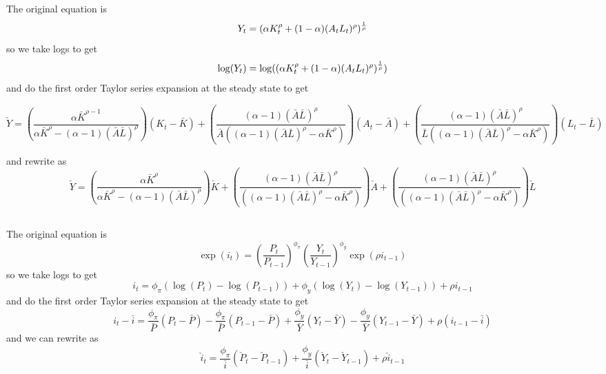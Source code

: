 \documentclass[11pt]{amsart}
\begin{document}
\subsection{}
The original equation is
\[
Y_t = (\alpha K_t^{\rho} + (1-\alpha)(A_t L_t)^{\rho})^{1 \over \rho}
\]
so we take logs to get
\[
\log(Y_t) = \log((\alpha K_t^{\rho} + (1-\alpha)(A_t L_t)^{\rho})^{1 \over \rho})
\]
and do the first order Taylor series expansion at the steady state to get
\begin{tiny}
\[
\check{Y}  = \left(\frac{\alpha  \bar{K}^{\rho -1}}{\alpha  \bar{K}^{\rho }-(\alpha -1) (\bar{A} \bar{L})^{\rho }}\right) (K_t - \bar{K}) + \left(\frac{(\alpha -1) (\bar{A} \bar{L})^{\rho }}{\bar{A} \left((\alpha -1) (\bar{A} \bar{L})^{\rho }-\alpha  \bar{K}^{\rho }\right)}\right) (A_t - \bar{A}) + \left(\frac{(\alpha -1) (\bar{A} \bar{L})^{\rho }}{\bar{L} \left((\alpha -1) (\bar{A} \bar{L})^{\rho }-\alpha  \bar{K}^{\rho }\right)}\right)(L_t - \bar{L})
\]
\end{tiny}
and rewrite as
\[
\check{Y}  = \left(\frac{\alpha  \bar{K}^{\rho}}{\alpha  \bar{K}^{\rho }-(\alpha -1) (\bar{A} \bar{L})^{\rho }}\right) \check{K} + \left(\frac{(\alpha -1) (\bar{A} \bar{L})^{\rho }}{\left((\alpha -1) (\bar{A} \bar{L})^{\rho }-\alpha  \bar{K}^{\rho }\right)}\right) \check{A} + \left(\frac{(\alpha -1) (\bar{A} \bar{L})^{\rho }}{\left((\alpha -1) (\bar{A} \bar{L})^{\rho }-\alpha  \bar{K}^{\rho }\right)}\right) \check{L}
\]


\subsection{}

\subsection{}

\subsection{}
The original equation is
\[
\exp(i_t) = \left(\frac{P_t}{P_{t-1}} \right)^{\phi_{\pi}} \left(\frac{Y_t}{Y_{t-1}} \right)^{\phi_y} \exp(\rho i_{t-1})
\]
so we take logs to get
\[
i_t = \phi_{\pi}(\log(P_t) - \log(P_{t-1})) + \phi_y (\log(Y_t) - \log(Y_{t-1})) + \rho i_{t-1}
\]
and do the first order Taylor series expansion at the steady state to get
\[
i_t - \bar{i} = \frac{\phi_{\pi}}{\bar{P}} (P_t - \bar{P}) - \frac{\phi_{\pi}}{\bar{P}} (P_{t-1} - \bar{P}) +\frac{\phi_y}{\bar{Y}} (Y_t - \bar{Y}) - \frac{\phi_y}{\bar{Y}} (Y_{t-1} - \bar{Y}) + \rho(i_{t-1} - \bar{i})
\]
and we can rewrite as
\[
\check{i}_t = \frac{\phi_{\pi}}{\bar{i}} (\check{P}_t - \check{P}_{t-1})  +\frac{\phi_y}{\bar{i}} (\check{Y}_t - \check{Y}_{t-1}) + \rho \check{i}_{t-1}
\]
\end{document}
